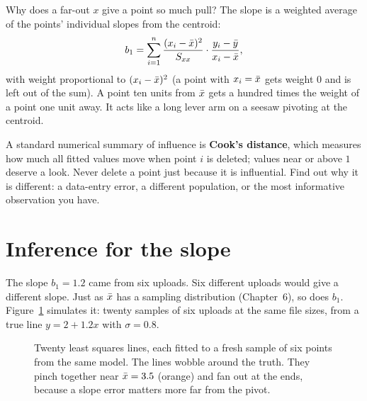 \begin{whybox}
Why does a far-out $x$ give a point so much pull? The slope is a weighted
average of the points' individual slopes from the centroid:
\[
  b_1 = \sum_{i=1}^n \frac{(x_i-\bar{x})^2}{S_{xx}}\cdot\frac{y_i-\bar{y}}{x_i-\bar{x}},
\]
with weight proportional to $(x_i-\bar{x})^2$ (a point with $x_i=\bar{x}$ gets
weight $0$ and is left out of the sum). A point ten units from $\bar{x}$
gets a hundred times the weight of a point one unit away. It acts like a long
lever arm on a seesaw pivoting at the centroid.
\end{whybox}

A standard numerical summary of influence is \textbf{Cook's distance}, which
measures how much all fitted values move when point $i$ is deleted; values
near or above $1$ deserve a look. Never delete a point just because it is
influential. Find out why it is different: a data-entry error, a different
population, or the most informative observation you have.

\section{Inference for the slope}
\label{sec:slr-inference}

The slope $b_1 = 1.2$ came from six uploads. Six different uploads would give a
different slope. Just as $\bar{x}$ has a sampling distribution (Chapter~6), so
does $b_1$. Figure~\ref{fig:slr-many-lines} simulates it: twenty samples of six
uploads at the same file sizes, from a true line $y = 2 + 1.2x$ with
$\sigma = 0.8$.

\begin{figure}[H]
\centering
{}
\caption{Twenty least squares lines, each fitted to a fresh sample of six
points from the same model. The lines wobble around the truth. They pinch
together near $\bar{x}=3.5$ (orange) and fan out at the ends, because a slope
error matters more far from the pivot.}
\label{fig:slr-many-lines}
\end{figure}

